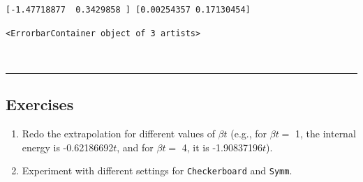     \begin{Verbatim}[commandchars=\\\{\}]
[-1.47718877  0.3429858 ] [0.00254357 0.17130454]
    \end{Verbatim}

            \begin{tcolorbox}[breakable, size=fbox, boxrule=.5pt, pad at break*=1mm, opacityfill=0]
\begin{Verbatim}[commandchars=\\\{\}]
<ErrorbarContainer object of 3 artists>
\end{Verbatim}
\end{tcolorbox}
        
    \begin{center}
    \end{center}
    { \hspace*{\fill} \\}
    
    \begin{center}\rule{0.5\linewidth}{\linethickness}\end{center}

\hypertarget{exercises}{%
\subsection{Exercises}\label{exercises}}

\begin{enumerate}
\def\labelenumi{\arabic{enumi}.}
\tightlist
\item
  Redo the extrapolation for different values of \(\beta t\) (e.g., for
  \(\beta t =\) 1, the internal energy is -0.62186692\(t\), and for
  \(\beta t =\) 4, it is -1.90837196\(t\)).
\item
  Experiment with different settings for \texttt{Checkerboard} and
  \texttt{Symm}.
\end{enumerate}


    
    
    
